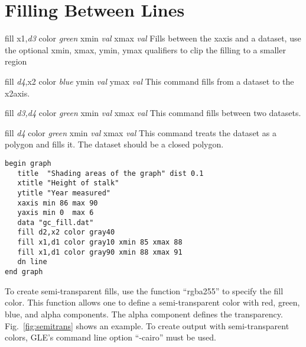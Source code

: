 
\section{Filling Between Lines}
\label{cmd:fill}
\begin{commanddescription}
  
 
\item[{\sf fill x1,{\it d3} color {\it green}  xmin {\it val} xmax {\it val}} ]
Fills between the xaxis and a dataset, use the optional
{\sf xmin, xmax, ymin, ymax} qualifiers to clip the filling
to a smaller region

\item[{\sf fill {\it d4},x2 color {\it blue}   ymin {\it val} ymax {\it val}} ]
This command fills from a dataset to the x2axis.

\item[{\sf fill {\it d3,d4} color {\it green}  xmin {\it val} xmax {\it val}} ]
This command fills between two datasets.

\item[{\sf fill {\it d4} color {\it green}  xmin {\it val} xmax {\it val}} ]
This command treats the dataset as a polygon and fills it. The dataset
should be a closed polygon.

\begin{minipage}[c]{8cm}
\begin{Verbatim}
begin graph
   title  "Shading areas of the graph" dist 0.1
   xtitle "Height of stalk"
   ytitle "Year measured"
   xaxis min 86 max 90
   yaxis min 0  max 6
   data "gc_fill.dat"
   fill d2,x2 color gray40 
   fill x1,d1 color gray10 xmin 85 xmax 88
   fill x1,d1 color gray90 xmin 88 xmax 91
   dn line
end graph
\end{Verbatim}
\end{minipage}
\hfill
\begin{minipage}[c]{7cm}
\mbox{}
\end{minipage}

\end{commanddescription}

To create semi-transparent fills, use the function ``rgba255'' to specify the fill color. This function allows one to define a semi-transparent color with red, green, blue, and alpha components. The alpha component defines the transparency. Fig.~\ref{fig:semitrans} shows an example. To create output with semi-transparent colors, GLE's command line option ``-cairo'' must be used.

